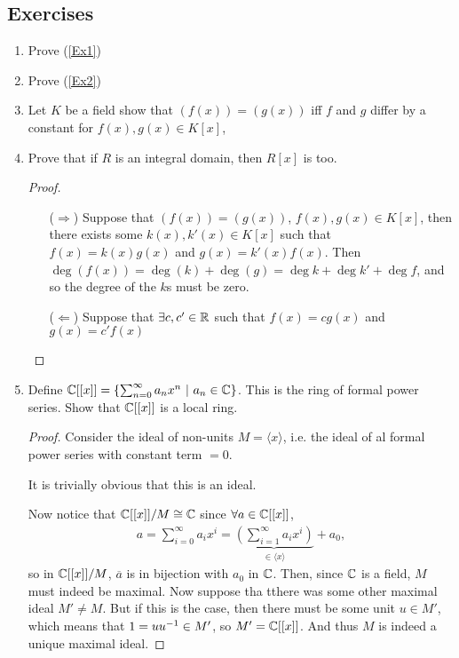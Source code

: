 \documentclass[12pt, twosided]{article}
\begin{document}
\subsection{Exercises}
\begin{enumerate}
\item Prove (\ref{Ex1})
\item Prove (\ref{Ex2})
\item Let \(K\) be a field show that \((f(x)) = (g(x))\) iff \(f\) and \(g\) differ by a constant for \(f(x), g(x) \in K[x]\), 
\item Prove that if \(R\) is an integral domain, then \(R[x]\) is too.
  \begin{proof}
    \begin{enumerate}
    \item [(\(\Rightarrow\))]Suppose that \((f(x)) = (g(x))\), \(f(x), g(x) \in K[x]\), then there exists some \(k(x), k\prime(x) \in K[x]\) such that \(f(x) = k(x)g(x)\) and \(g(x) = k\prime(x)f(x)\). Then \(\deg(f(x)) = \deg(k) + \deg(g) = \deg k + \deg k\prime + \deg f\), and so the degree of the \(k\)s must be zero.
    \item [(\(\Leftarrow\))] Suppose that \(\exists c, c\prime \in \R\) such that \(f(x) = cg(x)\) and \(g(x) = c\prime f(x)\)
    \end{enumerate}
  \end{proof}
\item Define \(\mathbb{C}[[x]] = \left\{ \sum_{n=0}^\infty a_nx^n \ \middle\vert\  a_n \in \mathbb{C}\right\}\). This is the ring of formal power series. Show that \(\mathbb{C}[[x]]\) is a local ring.

  \begin{proof}
    Consider the ideal of non-units \(M = \langle x \rangle\), i.e. the ideal of al formal power series with constant term \(= 0\).

    It is trivially obvious that this is an ideal.

    Now notice that \(\mathbb{C}[[x]]/M \cong \mathbb{C}\) since \(\forall a \in \mathbb{C}[[x]]\),
    \begin{align*}
      a = \sum_{i=0}^\infty a_ix^i = \underbrace{\left(\sum_{i = 1}^\infty a_ix^i\right)}_{\in \langle x \rangle} + a_0,
    \end{align*}
    so in \(\mathbb{C}[[x]]/M\), \(\overline{a}\) is in bijection with \(a_0\) in \(\mathbb{C}\). Then, since \(\mathbb{C}\) is a field, \(M\) must indeed be maximal. Now suppose tha tthere was some other maximal ideal \(M\prime \neq M\). But if this is the case, then there must be some unit \(u \in M\prime\), which means that \(1 = uu\1 \in M\prime\), so \(M\prime = \C[[x]]\). And thus \(M\) is indeed a unique maximal ideal.
  \end{proof}
\end{enumerate}
\end{document}
